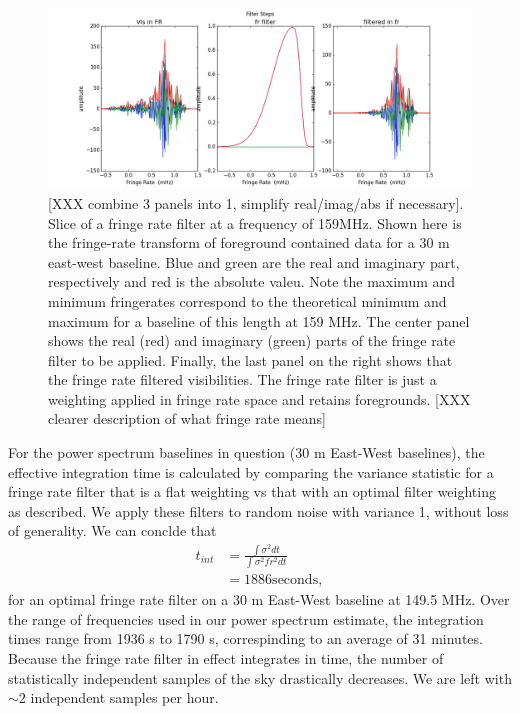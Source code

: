 \documentclass[twocolumn,numberedappendix]{emulateapj} \shorttitle{PSA64}
\begin{document}
\begin{figure}[t!]\centering
\includegraphics[width=2\columnwidth]{plots/fr_preserved_signal.png}
\caption{
[XXX combine 3 panels into 1, simplify real/imag/abs if necessary].
Slice of a fringe rate filter at a frequency of 159MHz. Shown here is
the fringe-rate transform of foreground contained data for a 30 m east-west
baseline. Blue and green are the real and imaginary part, respectively and red
is the absolute valeu. Note the maximum and minimum fringerates correspond to
the theoretical minimum and maximum for a baseline of this length at 159 MHz.
The center panel shows the real (red)  and imaginary (green) parts of the fringe
rate filter to be applied. Finally, the last panel on the right shows that the
fringe rate filtered visibilities. The fringe rate filter is just a weighting
applied in fringe rate space and retains foregrounds.
[XXX clearer description of what fringe rate means]
}
\label{fig:fr_preserved_signal}
\end{figure}

For the power spectrum baselines in question (30 m East-West baselines), the
effective integration time is calculated by comparing the variance statistic for
a fringe rate filter that is a flat weighting vs that with an optimal filter
weighting as described. We apply these filters to random noise with variance 1,
without loss of generality. We can conclde that 
\begin{align}
    t_{int} &= \frac{\int{\sigma^{2}dt}}{\int{\sigma^{2}fr^{2}dt}}\\
            &= 1886 \text{seconds},
\end{align}
for an optimal fringe rate filter on a 30 m East-West baseline at 149.5 MHz.
Over the range of frequencies used in our power spectrum estimate, the
integration times range from 1936 s to 1790 s, correspinding to an average of 31
minutes. Because the fringe rate filter in effect integrates in time, the number
of statistically independent samples of the sky drastically decreases. We are
left with $\sim2$ independent samples per hour.
\end{document}

